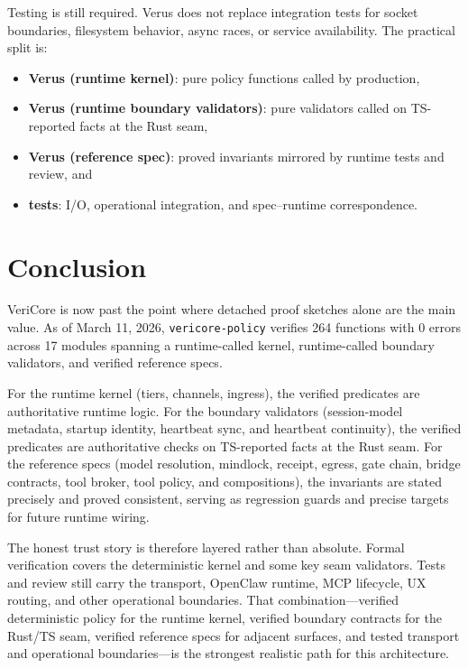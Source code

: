 \documentclass[11pt]{article}
\begin{document}
Testing is still required. Verus does not replace integration tests for socket boundaries, filesystem behavior, async races, or service availability. The practical split is:
\begin{itemize}[leftmargin=1.5em]
\item \textbf{Verus (runtime kernel)}: pure policy functions called by production,
\item \textbf{Verus (runtime boundary validators)}: pure validators called on TS-reported facts at the Rust seam,
\item \textbf{Verus (reference spec)}: proved invariants mirrored by runtime tests and review, and
\item \textbf{tests}: I/O, operational integration, and spec--runtime correspondence.
\end{itemize}

\section{Conclusion}
VeriCore is now past the point where detached proof sketches alone are the main value. As of March 11, 2026, \texttt{vericore-policy} verifies 264 functions with 0 errors across 17 modules spanning a runtime-called kernel, runtime-called boundary validators, and verified reference specs.

For the runtime kernel (tiers, channels, ingress), the verified predicates are authoritative runtime logic. For the boundary validators (session-model metadata, startup identity, heartbeat sync, and heartbeat continuity), the verified predicates are authoritative checks on TS-reported facts at the Rust seam. For the reference specs (model resolution, mindlock, receipt, egress, gate chain, bridge contracts, tool broker, tool policy, and compositions), the invariants are stated precisely and proved consistent, serving as regression guards and precise targets for future runtime wiring.

The honest trust story is therefore layered rather than absolute. Formal verification covers the deterministic kernel and some key seam validators. Tests and review still carry the transport, OpenClaw runtime, MCP lifecycle, UX routing, and other operational boundaries. That combination---verified deterministic policy for the runtime kernel, verified boundary contracts for the Rust/TS seam, verified reference specs for adjacent surfaces, and tested transport and operational boundaries---is the strongest realistic path for this architecture.
\end{document}
